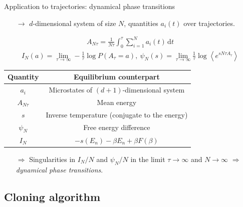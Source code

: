 \documentclass{beamer}
\begin{document}
\begin{frame}{Application to trajectories: dynamical phase transitions}

\begin{itemize}
  \item[$\rightarrow$] $d$-dimensional system of size $N$, quantities $a_i(t)$ over trajectories.
\end{itemize}

\begin{align*}
A_{N \tau} = \frac{1}{N \tau} \int_0^{\tau} \sum_{i=1}^N a_i(t) \, \text{d}t
\end{align*}
\begin{align*}
I_N(a) = \lim_{\tau \rightarrow \infty} -\frac{1}{\tau} \log P(A_{\tau} = a),~ \psi_N(s) = \lim_{\tau \rightarrow \infty} \frac{1}{\tau} \log \left<e^{s N \tau A_{\tau}}\right>
\end{align*}

\return
\begin{table}
\begin{tabular}{c | c}
\rowcolor{CaLightPink}
\bf Quantity & \bf Equilibrium counterpart\\
\hline \hline
\rowcolor{white!90!CaLightPink}
$a_i$ & Microstates of $(d+1)$-dimensional system\\
\rowcolor{white!80!CaLightPink}
$A_{N\tau}$ & Mean energy\\
\rowcolor{white!90!CaLightPink}
$s$ & Inverse temperature (conjugate to the energy)\\
\rowcolor{white!80!CaLightPink}
$\psi_N$ & Free energy difference\\
\rowcolor{white!90!CaLightPink}
$I_N$ & $-s(E_n) - \beta E_n + \beta F(\beta)$
\end{tabular}
\end{table}

\pause
\return
\begin{itemize}
  \item[$\Rightarrow$] Singularities in $I_N/N$ and $\psi_N/N$ in the limit $\tau \rightarrow \infty$ and $N \rightarrow \infty$ $\Rightarrow$ \textit{dynamical phase transitions}.
\end{itemize}

\end{frame}

\subsection{Cloning algorithm}
\end{document}
